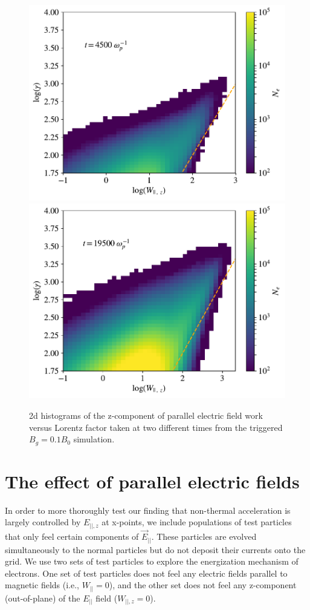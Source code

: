 \documentclass[iop,twocolappendix]{emulateapj}
\begin{document}
\begin{figure}[htp] 
	\includegraphics[width=\linewidth]{bguide1_triggered_final_wparz_gam_t15.pdf}
	\newline
	\includegraphics[width=\linewidth]{bguide1_triggered_final_wparz_gam_t65.pdf}
	
	\caption{2d histograms of the z-component of parallel electric field work versus Lorentz factor taken at two different times from the triggered $B_{g}=0.1B_{0}$ simulation.}
	\label{bguide1_wpar_hist}
\end{figure}


\section{The effect of parallel electric fields}\label{test_prtls}
In order to more thoroughly test our finding that non-thermal acceleration is largely controlled by  $E_{||,z}$ at x-points, we include populations of test particles that only feel certain components of $\vec{E}_{||}$.  These particles are evolved simultaneously to the normal particles but do not deposit their currents onto the grid.  We use two sets of test particles to explore the energization mechanism of electrons.  One set of test particles does not feel any electric fields parallel to magnetic fields (i.e., $W_{||}=0$), and the other set does not feel any z-component (out-of-plane) of the $E_{||}$ field ($W_{||,z}=0$).  
\end{document}
